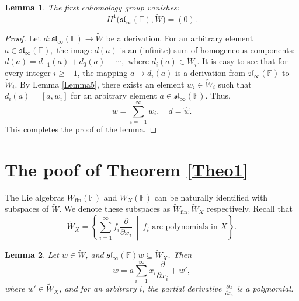\documentclass[12pt,a4paper]{amsart}
\theoremstyle{plain}
\newtheorem{Lemma}{Lemma}
\begin{document}
	\begin{Lemma}\label{Lemma6} The first cohomology group vanishes: $$H^1\big(\mathfrak{sl}_{\infty}(\mathbb{F}), \widetilde{W}\big) = (0).$$ \end{Lemma}
	\begin{proof} Let $d:\mathfrak{sl}_{\infty}(\mathbb{F})\to \widetilde{W}$ be a derivation. For an arbitrary element $a\in \mathfrak{sl}_{\infty}(\mathbb{F}),$ the image $d(a)$ is an (infinite) sum of homogeneous components: $d(a)=d_{-1}(a)+d_0(a)+\cdots , $ where $d_i(a)\in \widetilde{W}_i.$ It is easy to  see that for every integer $i \geq -1$, the mapping $a\to d_i(a)$ is a derivation from $\mathfrak{sl}_{\infty}(\mathbb{F})$ to $\widetilde{W}_i$.  By Lemma \ref{Lemma5}, there exists an element $w_i \in \widetilde{W}_i$ such that $d_i(a) = [a, w_i]$ for an arbitrary element $a \in \mathfrak{sl}_\infty(\mathbb{F})$. Thus, $$w = \sum_{i=-1}^{\infty} w_i, \quad d = \hat{w}.$$ This completes the proof of the lemma. \end{proof}
	
	\section{The poof of Theorem \ref{Theo1}}
	
	The Lie algebras $W_{\text{fin}}(\mathbb{F})$ and $W_X(\mathbb{F})$ can be naturally identified with subspaces of $\widetilde{W}$. We denote these subspaces as $\widetilde{W}_{\text{fin}}, \widetilde{W}_X$ respectively. Recall that
	\[
	\widetilde{W}_X = \left\{ \sum_{i=1}^{\infty} f_i \frac{\partial}{\partial x_i} \ \middle| \ f_i \text{ are polynomials in } X \right\}.
	\]
	
	
	
	\begin{Lemma}\label{Lemma7} Let $w \in \widetilde{W}$, and $\mathfrak{sl}_\infty(\mathbb{F}) w \subseteq \widetilde{W}_X$. Then
		\[
		w = a \sum_{i=1}^{\infty} x_i \frac{\partial}{\partial x_i} + w',
		\]
		where $w' \in \widetilde{W}_X$, and for an arbitrary $i$, the partial derivative $\frac{\partial a}{\partial x_i}$ is a polynomial. \end{Lemma}
	
\end{document}
